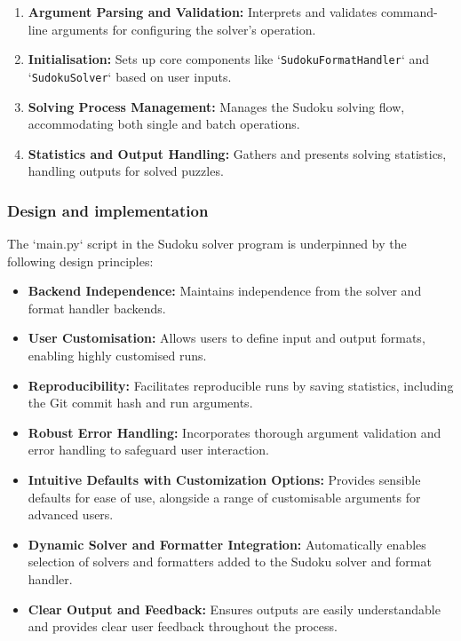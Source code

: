 \documentclass[11pt]{article}
\begin{document}
\begin{enumerate}
    \item \textbf{Argument Parsing and Validation:} Interprets and validates command-line arguments for configuring the solver's operation.
    \item \textbf{Initialisation:} Sets up core components like `\texttt{SudokuFormatHandler}` and `\texttt{SudokuSolver}` based on user inputs.
    \item \textbf{Solving Process Management:} Manages the Sudoku solving flow, accommodating both single and batch operations.
    \item \textbf{Statistics and Output Handling:} Gathers and presents solving statistics, handling outputs for solved puzzles.
\end{enumerate}

\subsubsection{Design and implementation}
The `main.py` script in the Sudoku solver program is underpinned by the following design principles:

\begin{itemize}
    \item \textbf{Backend Independence:} Maintains independence from the solver and format handler backends.
    \item \textbf{User Customisation:} Allows users to define input and output formats, enabling highly customised runs.
    \item \textbf{Reproducibility:} Facilitates reproducible runs by saving statistics, including the Git commit hash and run arguments.
    \item \textbf{Robust Error Handling:} Incorporates thorough argument validation and error handling to safeguard user interaction.
    \item \textbf{Intuitive Defaults with Customization Options:} Provides sensible defaults for ease of use, alongside a range of customisable arguments for advanced users.
    \item \textbf{Dynamic Solver and Formatter Integration:} Automatically enables selection of solvers and formatters added to the Sudoku solver and format handler.
    \item \textbf{Clear Output and Feedback:} Ensures outputs are easily understandable and provides clear user feedback throughout the process.
\end{itemize}
\end{document}
